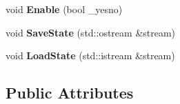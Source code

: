 \begin{DoxyCompactItemize}
\item 
\hypertarget{classMixerChannel_a3c9dfb6c96a54fbcbd420a5e94071b00}{void {\bfseries Enable} (bool \-\_\-yesno)}\label{classMixerChannel_a3c9dfb6c96a54fbcbd420a5e94071b00}

\item 
\hypertarget{classMixerChannel_abb599beb2f871559791e5cca33b4584f}{void {\bfseries Save\-State} (std\-::ostream \&stream)}\label{classMixerChannel_abb599beb2f871559791e5cca33b4584f}

\item 
\hypertarget{classMixerChannel_a50d622047c015fe4132ce210f83dbd6a}{void {\bfseries Load\-State} (std\-::istream \&stream)}\label{classMixerChannel_a50d622047c015fe4132ce210f83dbd6a}

\end{DoxyCompactItemize}
\subsection*{Public Attributes}
